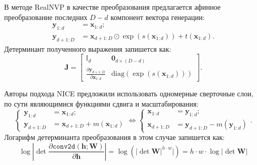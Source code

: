 В методе RealNVP \cite{dinh2016density} в качестве преобразования предлагается афинное преобразование последних $D-d$ компонент вектора генерации:  
\begin{equation}
    \begin{aligned}
        \mathbf{y}_{1:d} &= \mathbf{x}_{1:d}; \\ 
        \mathbf{y}_{d+1:D} &= \mathbf{x}_{d+1:D} \odot \exp({s(\mathbf{x}_{1:d})}) + t(\mathbf{x}_{1:d}).
    \end{aligned}
\end{equation}
Детерминант полученного выражения запишется как:
\begin{equation}
    \mathbf{J} = 
    \begin{bmatrix}
    \mathbb{I}_d & \mathbf{0}_{d\times(D-d)} \\[5pt]
    \frac{\partial \mathbf{y}_{d+1:D}}{\partial \mathbf{x}_{1:d}} & \text{diag}(\exp(s(\mathbf{x}_{1:d})))
    \end{bmatrix}.
\end{equation}

Авторы подхода NICE \cite{dinh2014nice} предложили использовать одномерные сверточные слои, по сути являющимися функциями сдвига и масштабирования:
\begin{equation}
    \begin{cases}
    \mathbf{y}_{1:d} &= \mathbf{x}_{1:d}; \\ 
    \mathbf{y}_{d+1:D} &= \mathbf{x}_{d+1:D} + m(\mathbf{x}_{1:d})
    \end{cases}
    \Leftrightarrow 
    \begin{cases}
    \mathbf{x}_{1:d} &= \mathbf{y}_{1:d}; \\ 
    \mathbf{x}_{d+1:D} &= \mathbf{y}_{d+1:D} - m(\mathbf{y}_{1:d})
    \end{cases}.
\end{equation}
Логарифм детерминанта преобразования в этом случае запишется как:
\begin{equation}
    \log \left\vert\det \frac{\partial\texttt{conv2d}(\mathbf{h}; \mathbf{W})}{\partial\mathbf{h}}\right\vert
    = \log (\vert\det\mathbf{W}\vert^{h \cdot w}\vert) = h \cdot w \cdot \log \vert\det\mathbf{W}\vert
\end{equation}



